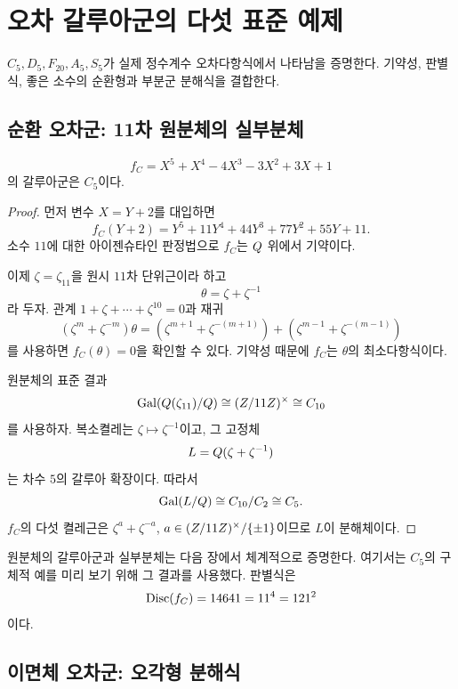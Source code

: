 \clearpage
\section{오차 갈루아군의 다섯 표준 예제}
\label{sec:quintic-worked-examples}

\begin{learninggoal}
$C_5,D_5,F_{20},A_5,S_5$가 실제 정수계수 오차다항식에서 나타남을 증명한다. 기약성, 판별식, 좋은 소수의 순환형과 부분군 분해식을 결합한다.
\end{learninggoal}

\subsection{순환 오차군: 11차 원분체의 실부분체}

\begin{example}
\label{ex:quintic-c5}
\[
  f_C=X^5+X^4-4X^3-3X^2+3X+1
\]
의 갈루아군은 $C_5$이다.
\end{example}

\begin{proof}
먼저 변수 $X=Y+2$를 대입하면
\[
  f_C(Y+2)
  =Y^5+11Y^4+44Y^3+77Y^2+55Y+11.
\]
소수 $11$에 대한 아이젠슈타인 판정법으로 $f_C$는 $Q$ 위에서 기약이다.

이제 $\zeta=\zeta_{11}$을 원시 $11$차 단위근이라 하고
\[
  \theta=\zeta+\zeta^{-1}
\]
라 두자. 관계 $1+\zeta+\cdots+\zeta^{10}=0$과 재귀
\[
  (\zeta^m+\zeta^{-m})\theta
  =(\zeta^{m+1}+\zeta^{-(m+1)})
  +(\zeta^{m-1}+\zeta^{-(m-1)})
\]
를 사용하면 $f_C(\theta)=0$을 확인할 수 있다. 기약성 때문에 $f_C$는 $\theta$의 최소다항식이다.

원분체의 표준 결과
\[
  \operatorname{Gal}(Q(\zeta_{11})/Q)
  \cong(Z/11Z)^\times\cong C_{10}
\]
를 사용하자. 복소켤레는 $\zeta\mapsto\zeta^{-1}$이고, 그 고정체
\[
  L=Q(\zeta+\zeta^{-1})
\]
는 차수 $5$의 갈루아 확장이다. 따라서
\[
  \operatorname{Gal}(L/Q)\cong C_{10}/C_2\cong C_5.
\]
$f_C$의 다섯 켤레근은 $\zeta^a+\zeta^{-a}$, $a\in(Z/11Z)^\times/\{\pm1\}$이므로 $L$이 분해체이다.
\end{proof}

\begin{remark}
원분체의 갈루아군과 실부분체는 다음 장에서 체계적으로 증명한다. 여기서는 $C_5$의 구체적 예를 미리 보기 위해 그 결과를 사용했다. 판별식은
\[
  \operatorname{Disc}(f_C)=14641=11^4=121^2
\]
이다.
\end{remark}

\subsection{이면체 오차군: 오각형 분해식}

